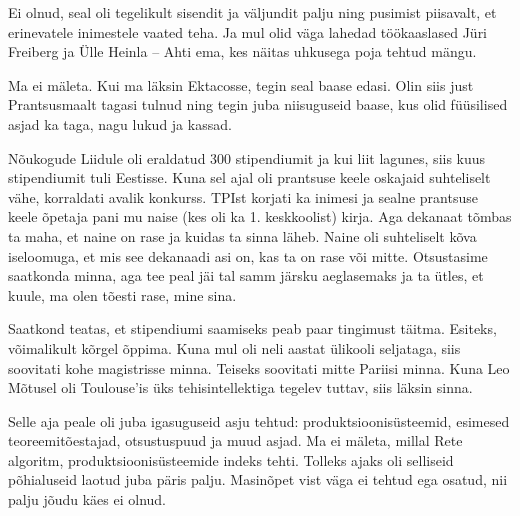 Ei olnud, seal oli tegelikult sisendit ja väljundit palju ning pusimist piisavalt, et erinevatele 
inimestele vaated teha. Ja mul olid väga lahedad 
töökaaslased Jüri Freiberg ja Ülle 
Heinla -- Ahti ema, kes näitas uhkusega poja
tehtud mängu. 


Ma ei mäleta. Kui ma läksin Ektacosse, tegin seal 
baase edasi. Olin siis just Prantsusmaalt tagasi tulnud ning tegin juba 
niisuguseid baase, kus olid füüsilised asjad ka taga, nagu lukud ja kassad.


Nõukogude Liidule oli eraldatud 300 stipendiumit ja kui liit 
lagunes, 
siis kuus stipendiumit tuli Eestisse. Kuna sel ajal oli prantsuse keele 
oskajaid suhteliselt vähe, korraldati 
avalik konkurss. TPIst korjati ka inimesi ja sealne prantsuse keele õpetaja 
pani mu naise (kes oli ka 1. keskkoolist) kirja. Aga dekanaat tõmbas ta 
maha, et naine on rase ja kuidas ta sinna läheb. Naine oli suhteliselt kõva 
iseloomuga, et mis see dekanaadi asi on, kas ta on rase või mitte. Otsustasime
saatkonda minna, aga tee peal jäi tal samm järsku 
aeglasemaks ja ta ütles, et kuule, ma olen tõesti rase, mine sina.

Saatkond teatas, et stipendiumi saamiseks 
peab paar tingimust täitma. Esiteks, võimalikult kõrgel õppima. Kuna mul oli 
neli aastat ülikooli seljataga, siis soovitati kohe magistrisse minna. Teiseks soovitati mitte 
Pariisi minna. Kuna Leo Mõtusel oli Toulouse'is 
üks tehisintellektiga tegelev tuttav, siis läksin 
sinna.


Selle aja peale oli juba igasuguseid asju tehtud: 
produktsioonisüsteemid, esimesed teoreemitõestajad, otsustuspuud ja muud asjad. Ma ei mäleta, millal 
Rete algoritm,
produktsioonisüsteemide indeks tehti. Tolleks ajaks oli 
selliseid põhialuseid laotud juba päris palju. Masinõpet vist väga 
ei tehtud ega osatud, nii palju jõudu käes ei olnud.

